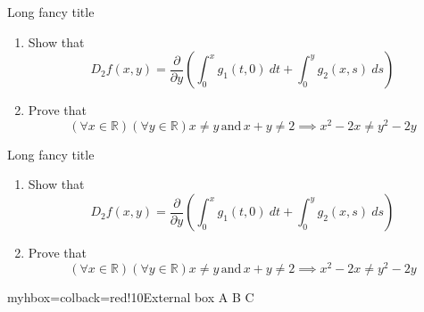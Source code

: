 \documentclass[a4paper]{article}
\begin{document}
	
	\begin{myhbox}{Long fancy title}
		\begin{enumerate}
			\item Show that
			\[D_2f(x,y) = \frac{\partial{}}{\partial{y}} \left ( \int_0^xg_1 (t,0)\ dt + \int_0^y g_2(x,s)\ ds \right)\]
			\item Prove that
			\[\left(\forall x\in\mathbb{R}  \right)\left(\forall y \in \mathbb{R} \right) x\neq y\, \text{and} \, x+y \neq 2 \implies x^{2}-2x \neq y^2-2y\]
		\end{enumerate}
	\end{myhbox}
	
	\begin{myvbox}[colframe=red!80!black]{Long fancy title}
		\begin{enumerate}
			\item Show that
			\[D_2f(x,y) = \frac{\partial{}}{\partial{y}} \left ( \int_0^xg_1 (t,0)\ dt + \int_0^y g_2(x,s)\ ds \right)\]
			\item Prove that
			\[\left(\forall x\in\mathbb{R}  \right)\left(\forall y \in \mathbb{R} \right) x\neq y\, \text{and} \, x+y \neq 2 \implies x^{2}-2x \neq y^2-2y\]
		\end{enumerate}
	\end{myvbox}
	
	\begin{tcboxeditemize}[raster columns=3, myhbox={colback=yellow!10, colframe=red!70!black}{Box \# \thetcbrasternum} ]{myhbox={colback=red!10}{External box}}
		\tcbitem A
		\tcbitem[notitle, myvbox={colback=green!70!black, height=4cm}{Box \# \thetcbrasternum}] B
		\tcbitem C
	\end{tcboxeditemize}
	
\end{document}
